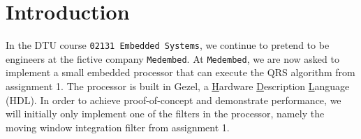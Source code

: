 \vspace*{1cm}
\section{Introduction}
In the DTU course \texttt{02131 Embedded Systems}, we continue to pretend to be engineers at the fictive company \texttt{Medembed}. At \texttt{Medembed}, we are now asked to implement a small embedded processor that can execute the QRS algorithm from assignment 1. The processor is built in Gezel, a \underline{H}ardware \underline{D}escription \underline{L}anguage (HDL).
In order to achieve proof-of-concept and demonstrate performance, we will initially only implement one of the filters in the processor, namely the moving window integration filter from assignment 1. 
\vfill